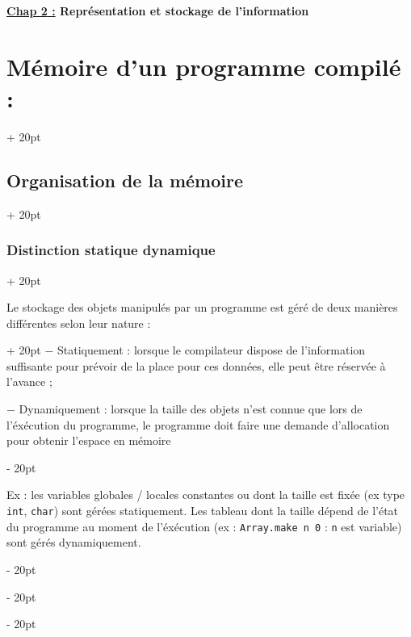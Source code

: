 \documentclass[a4paper, 12pt, twoside]{article}
\renewcommand{\emph}{\textcolor{ff4500}}
\newcommand{\ind}[1][20pt]{\advance\leftskip + #1}
\newcommand{\deind}[1][20pt]{\advance\leftskip - #1}
\newenvironment{indentedenv}[1][20pt]{\par \ind[#1]}{\par \deind}
\newenvironment{indt}[2][20pt]{#2 \begin{indentedenv}[#1]}{\end{indentedenv}} %
\newcommand{\thetitle}[2]{\begin{center}\textbf{{\LARGE \underline{\emph{#1} :}} {\Large #2}}\end{center}}
\begin{document}
    \thetitle{Chap 2}{Représentation et stockage de l'information}
    
    \tableofcontents
    \newpage
    
    
    \begin{indt}{\section{Mémoire d'un programme compilé :}}
        
        \begin{indt}{\subsection{Organisation de la mémoire}}
            
            \begin{indt}{\subsubsection{Distinction statique dynamique}}

                \begin{indt}{Le stockage des objets manipulés par un programme est géré de deux manières différentes selon leur nature :}
                    $-$ Statiquement : lorsque le compilateur dispose de l'information suffisante pour prévoir de la place pour ces données, elle peut être réservée à l'avance ;
                    
                    \vspace{6pt}
                    
                    $-$ Dynamiquement : lorsque la taille des objets n'est connue que lors de l'éxécution du programme, le programme doit faire une demande d'allocation pour obtenir l'espace en mémoire
                \end{indt}
                
                \vspace{6pt}
                    
                Ex : les variables globales / locales constantes ou dont la taille est fixée (ex type \texttt{int}, \texttt{char}) sont gérées statiquement.
                Les tableau dont la taille dépend de l'état du programme au moment de l'éxécution (ex : \texttt{Array.make n 0} : \texttt n est variable) sont gérés dynamiquement.
                
                \vspace{6pt}
                

\end{indt}
\end{indt}
\end{indt}
\end{document}
